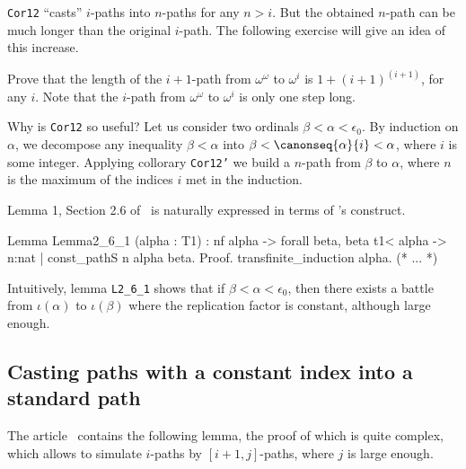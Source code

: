 \begin{remark}
 \texttt{Cor12} ``casts'' $i$-paths into $n$-paths for any $n>i$.
But the obtained $n$-path can be much longer than the original $i$-path.
The following exercise will give an idea of this increase. 
\end{remark}

\begin{exercise}
  Prove that  the length of the $i+1$-path from
  $\omega^\omega$ to $\omega^i$ is $1 + (i+1)^{(i+1)}$, for any $i$. Note that the $i$-path from
  $\omega^\omega$ to $\omega^i$ is only one step long.
 \end{exercise}


Why is \texttt{Cor12} so useful? 
Let us  consider two ordinals  $\beta<\alpha<\epsilon_0$. By induction on $\alpha$,
we decompose any inequality $\beta<\alpha$ into $\beta < \canonseq{\alpha}{i}< \alpha$, where $i$ is some integer. Applying collorary \texttt{Cor12'} we build a $n$-path from $\beta$ to $\alpha$,
where $n$ is the maximum of the indices $i$ met in the induction.

 Lemma 1, Section 2.6 of~\cite{KS81} is naturally expressed in terms of \coq's
\verb@sig@ construct.

\label{lemma:L-2_6-1}

\begin{Coqsrc}
Lemma Lemma2_6_1 (alpha : T1) :  
  nf alpha -> forall beta,  beta t1< alpha  ->
  {n:nat | const_pathS n alpha beta}.
Proof.
  transfinite_induction alpha.
  (* ... *)
\end{Coqsrc}



Intuitively, lemma   \texttt{L2\_6\_1}  shows that if $\beta<\alpha<\epsilon_0$, then there exists  a battle from $\iota(\alpha)$ to $\iota(\beta)$ where the replication factor is constant, although large enough. 







\subsection{Casting paths with a constant index into a standard path}


The article~\cite{KS81} contains 
the following lemma, the proof of which is quite complex, which allows to simulate $i$-paths by $[i+1,j]$-paths, where $j$ is large enough.


